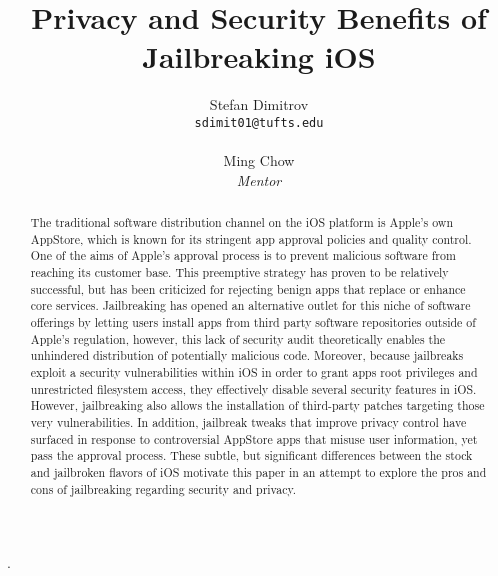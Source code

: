 \documentclass[12pt, titlepage, oneside]{article}
\title{Privacy and Security Benefits of Jailbreaking iOS}
\author{
  Stefan Dimitrov\\
  \texttt{sdimit01@tufts.edu}
  \\\\
  Ming Chow\\
  \emph{Mentor}
}
\begin{document}
\maketitle

\begin{abstract}

The traditional software distribution channel on the iOS platform is Apple's own AppStore, which is known for its stringent app approval policies and quality control. One of the aims of Apple's approval process is to prevent malicious software from reaching its customer base. This preemptive strategy has proven to be relatively successful, but has been criticized for rejecting benign apps that replace or enhance core services. Jailbreaking has opened an alternative outlet for this niche of software offerings by letting users install apps from third party software repositories outside of Apple's regulation, however, this lack of security audit theoretically enables the unhindered distribution of potentially malicious code. Moreover, because jailbreaks exploit a security vulnerabilities within iOS in order to grant apps root privileges and unrestricted filesystem access, they effectively disable several security features in iOS. However, jailbreaking also allows the installation of third-party patches targeting those very vulnerabilities. In addition, jailbreak tweaks that improve privacy control have surfaced in response to controversial AppStore apps that misuse user information, yet pass the approval process. These subtle, but significant differences between the stock and jailbroken flavors of iOS motivate this paper in an attempt to explore the pros and cons of jailbreaking regarding security and privacy.

\end{abstract}.



\tableofcontents

\pagebreak
\doublespacing
\end{document}
